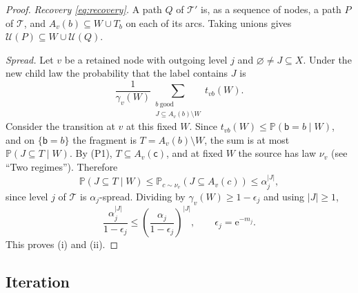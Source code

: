 \documentclass[11pt]{article}
\numberwithin{equation}{section}
\newcommand{\PP}{\mathbb P}
\newcommand{\TT}{\mathcal T}
\newcommand{\UU}{\mathcal U}
\newcommand{\ee}{\mathrm e}
\newcommand{\src}{\mathsf c}
\newcommand{\tgt}{\mathsf b}
\begin{document}
\begin{proof}
\emph{Recovery \eqref{eq:recovery}.} A path $Q$ of $\TT'$ is, as a
sequence of nodes, a path $P$ of $\TT$, and
$A_v(b)\subseteq W\cup T_b$ on each of its arcs. Taking unions gives
$\UU(P)\subseteq W\cup\UU(Q)$.

\emph{Spread.} Let $v$ be a retained node with outgoing level $j$ and
$\varnothing\ne J\subseteq X$. Under the new child law the probability
that the label contains $J$ is
\[
 \frac1{\gamma_v(W)}
 \sum_{\substack{b\ \mathrm{good}\\ J\subseteq A_v(b)\setminus W}}
 t_{vb}(W).
\]
Consider the transition at $v$ at this fixed $W$. Since
$t_{vb}(W)\le\PP(\tgt=b\mid W)$, and on $\{\tgt=b\}$ the fragment is
$T=A_v(b)\setminus W$, the sum is at most $\PP(J\subseteq T\mid W)$. By
(P1), $T\subseteq A_v(\src)$, and at fixed $W$ the source has law
$\nu_v$ (see ``Two regimes''). Therefore
\[
 \PP(J\subseteq T\mid W)\le\PP_{c\sim\nu_v}(J\subseteq A_v(c))
 \le\alpha_j^{|J|},
\]
since level $j$ of $\TT$ is $\alpha_j$-spread. Dividing by
$\gamma_v(W)\ge1-\epsilon_j$ and using $|J|\ge1$,
\[
 \frac{\alpha_j^{|J|}}{1-\epsilon_j}
 \le\left(\frac{\alpha_j}{1-\epsilon_j}\right)^{|J|},
 \qquad \epsilon_j=\ee^{-m_j}.
\]
This proves (i) and (ii).
\end{proof}

\subsection{Iteration}
\end{document}
